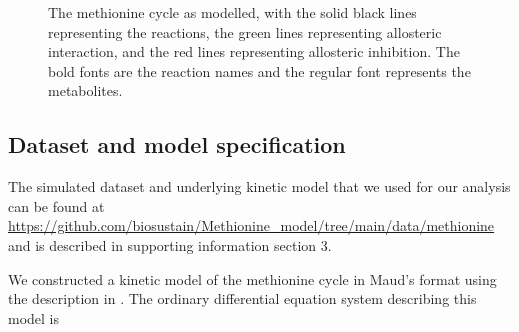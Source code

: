 \documentclass[journal=asbcd6,manuscript=article,layout=traditional]{achemso}
\begin{document}
\begin{figure}

\begin{minipage}[t]{\linewidth}

{\centering 


}

\end{minipage}%

\caption{\label{fig-methionine-reactions}The methionine cycle as
modelled, with the solid black lines representing the reactions, the
green lines representing allosteric interaction, and the red lines
representing allosteric inhibition. The bold fonts are the reaction
names and the regular font represents the metabolites.}

\end{figure}

\hypertarget{dataset-and-model-specification}{%
\subsection{Dataset and model
specification}\label{dataset-and-model-specification}}

The simulated dataset and underlying kinetic model that we used for our
analysis can be found at
\url{https://github.com/biosustain/Methionine_model/tree/main/data/methionine}
and is described in supporting information section 3.

We constructed a kinetic model of the methionine cycle in Maud's format
using the description in \citet{korendyaseva_allosteric_2008}. The
ordinary differential equation system describing this model is
\end{document}
